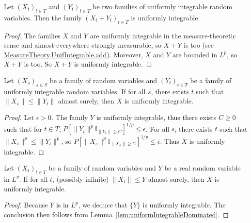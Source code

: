 \begin{lemma}\label{lem:uniformIntegrableAdd}
  \leanok
Let $(X_t)_{t \in T}$ and $(Y_t)_{t \in T}$ be two families of uniformly integrable random variables.
Then the family $(X_t + Y_t)_{t \in T}$ is uniformly integrable.
\end{lemma}

\begin{proof}
  \leanok
The families $X$ and $Y$ are uniformly integrable in the measure-theoretic sense and almost-everywhere strongly measurable, so $X + Y$ is too (see \href{https://leanprover-community.github.io/mathlib4_docs/Mathlib/MeasureTheory/Function/UniformIntegrable.html#MeasureTheory.UnifIntegrable.add}{MeasureTheory.UnifIntegrable.add}). Moreover, $X$ and $Y$ are bounded in $L^p$, so $X + Y$ is too. So $X + Y$ is uniformly integrable.
\end{proof}


\begin{lemma}\label{lem:uniformIntegrableDominated}
  \leanok
Let $(X_s)_{s \in S}$ be a family of random variables and $(Y_t)_{t \in T}$ be a family of uniformly integrable random variables. If for all $s$, there exists $t$ such that $\|X_s\| \le \|Y_t\|$ almost surely, then $X$ is uniformly integrable.
\end{lemma}

\begin{proof}
Let $\epsilon > 0$. The family $Y$ is uniformly integrable, thus there exists $C \ge 0$ such that for $t \in T$, $P[\|Y_t\|^p \mathbb{I}_{\|Y_t\| \ge C}]^{1/p} \le \epsilon$. For all $s$, there exists $t$ such that $\|X_s\|^p \le \|Y_t\|^p$, so $P[\|X_s\|^p \mathbb{I}_{\|X_s\| \ge C}]^{1/p} \le \epsilon$. Thus $X$ is uniformly integrable.
\end{proof}


\begin{lemma}\label{lem:uniformIntegrableDominatedSingleton}
  \leanok
Let $(X_t)_{t \in T}$ be a family of random variables and $Y$ be a real random variable in $L^p$. If for all $t$, (possibly infinite) $\|X_t\| \le Y$ almost surely, then $X$ is uniformly integrable.
\end{lemma}

\begin{proof}
Because $Y$ is in $L^p$, we deduce that $\{Y\}$ is uniformly integrable. The conclusion then follows from Lemma~\ref{lem:uniformIntegrableDominated}.
\end{proof}

